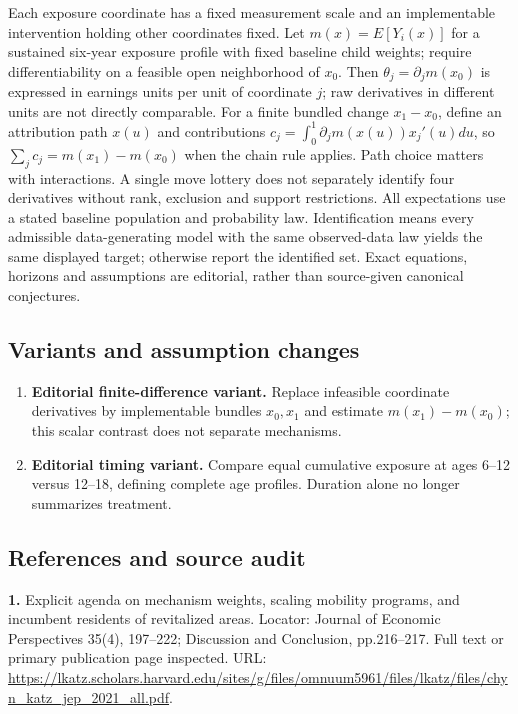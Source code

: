 \documentclass[11pt,a4paper]{article}
\begin{document}
Each exposure coordinate has a fixed measurement scale and an implementable intervention holding other coordinates fixed. Let \(m(x)=E[Y_i(x)]\) for a sustained six-year exposure profile with fixed baseline child weights; require differentiability on a feasible open neighborhood of \(x_0\). Then \(\theta_j=\partial_jm(x_0)\) is expressed in earnings units per unit of coordinate \(j\); raw derivatives in different units are not directly comparable. For a finite bundled change \(x_1-x_0\), define an attribution path \(x(u)\) and contributions \(c_j=\int_0^1\partial_jm(x(u))x_j'(u)du\), so \(\sum_jc_j=m(x_1)-m(x_0)\) when the chain rule applies. Path choice matters with interactions. A single move lottery does not separately identify four derivatives without rank, exclusion and support restrictions. All expectations use a stated baseline population and probability law. Identification means every admissible data-generating model with the same observed-data law yields the same displayed target; otherwise report the identified set. Exact equations, horizons and assumptions are editorial, rather than source-given canonical conjectures.
\subsection*{Variants and assumption changes}
\begin{enumerate}
\item \textbf{Editorial finite-difference variant.} Replace infeasible coordinate derivatives by implementable bundles \(x_0,x_1\) and estimate \(m(x_1)-m(x_0)\); this scalar contrast does not separate mechanisms.
\item \textbf{Editorial timing variant.} Compare equal cumulative exposure at ages 6–12 versus 12–18, defining complete age profiles. Duration alone no longer summarizes treatment.
\end{enumerate}
\subsection*{References and source audit}
\textbf{1.} Explicit agenda on mechanism weights, scaling mobility programs, and incumbent residents of revitalized areas. Locator: Journal of Economic Perspectives 35(4), 197–222; Discussion and Conclusion, pp.216–217. Full text or primary publication page inspected. URL: \url{https://lkatz.scholars.harvard.edu/sites/g/files/omnuum5961/files/lkatz/files/chyn_katz_jep_2021_all.pdf}.
\end{document}
